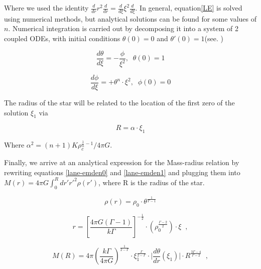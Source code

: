 Where we used the identity  $\frac{d}{dr} r^2 \frac{d}{dr} = \frac{d}{d\xi} \xi^2 \frac{d}{d\xi} $. In general, equation\ref{LE} is solved using numerical methods, but analytical solutions can be found for some values of $n$. Numerical integration is carried out by decomposing it into a system of 2 coupled ODEs, with initial conditions $\theta(0)=0$ and $\theta'(0)=1$(see. \cite{Shapiro:1983du})

\begin{equation}
\frac{d \theta}{d\xi} = -\frac{\phi}{\xi^2}, \;\; \theta(0)=1
\end{equation}

\begin{equation}
\frac{d \phi}{d\xi} = + \theta^n \cdot \xi^2, \;\; \phi(0)=0 
\end{equation}

The radius of the star will be related to the location of the first zero of the solution $\xi_1$ via 

\begin{equation}
R = \alpha \cdot \xi_1
\end{equation}

Where $\alpha^2=(n+1)K\rho_c^{\frac{1}{n}-1}/4\pi G$.


Finally, we arrive at an analytical expression for the Mass-radius relation by rewriting equations \ref{lane-emden0} and \ref{lane-emden1} and plugging them into $M(r) = 4\pi G \int_0^R dr' r'^2 \rho(r') $, where R is the radius of the star.

\begin{equation}\label{lane-emden2}
\rho(r) = \rho_0 \cdot \theta^{\frac{1}{\Gamma -1}} 
\end{equation}

\begin{equation}\label{lane-emden3}
r = \left[ \frac{4\pi G (\Gamma-1)}{k \Gamma} \right]^{-\frac{1}{2}} \cdot \left( \rho_0^{\frac{\Gamma-2}{2}} \right) \cdot \xi \;\; ,
\end{equation}

\begin{equation}\label{M-R}
M(R) = 4\pi \left( \frac{k \Gamma}{4\pi G} \right)^{\frac{1}{2-\Gamma}}\cdot \xi_1^{\frac{\Gamma}{2-\Gamma}} \cdot \Biggr| \frac{d\theta}{dr} (\xi_1) \Biggr| \cdot R^{\frac{3\Gamma -4}{\Gamma-2}} \;\; ,
\end{equation}


